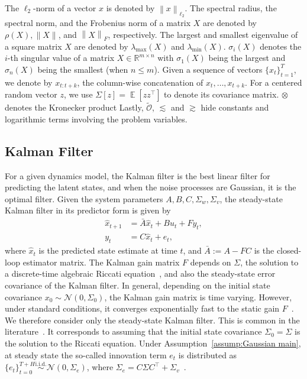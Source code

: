 \documentclass[11pt]{article}
\renewcommand{\cite}{\citep}
\newcommand{\xtil}{\hat{x}}
\newcommand{\Ncal}{\mathcal{N}}
\newcommand{\Ocal}{\mathcal{O}}
\newcommand{\E}{\operatorname{\mathbb{E}}}
\newcommand{\norm}[1]{\|{#1} \|}
\newcommand{\R}{\mathbb{R}}				%
\newcommand{\distas}{\overset{\text{i.i.d.}}{\sim}}
\newcommand{\T}{\top}
\newcommand{\fronorm}[1]{\left\|#1\right\|_{F}}
\newcommand{\twonorm}[1]{\left\|#1\right\|_{\ell_2}}
\newcommand{\<}{\langle}
\renewcommand{\>}{\rangle}
\numberwithin{equation}{section}
\begin{document}
 The $\ell_2$-norm of a vector $x$ is denoted by $\twonorm{x}$.
The spectral radius, the spectral norm, and the Frobenius norm of a matrix $X$ are denoted by $\rho(X), \norm{X}$, and $\fronorm{X}$, respectively. 
The largest and smallest eigenvalue of a square matrix $X$ are denoted by $\lambda_{\max}(X)$ and $\lambda_{\min}(X)$. $\sigma_i(X)$ denotes the $i$-th singular value of a matrix $X \in \R^{m \times n}$ with $\sigma_1(X)$ being the largest and $\sigma_{n}(X)$ being the smallest (when $n \leq m$). 
Given a sequence of vectors $\{x_t\}_{t=1}^T$, we denote by $x_{t:t+k}$, the column-wise concatenation of $x_t, \dots, x_{t+k}$. For a centered random vector $z$, we use $\Sigma[z] = \E[z z^\T]$ to denote its covariance matrix. $\otimes$ denotes the Kronecker product Lastly, $\tilde{\Ocal}$, $\lesssim$ and $\gtrsim$ hide constants and logarithmic terms involving the problem variables. 

\subsection{Kalman Filter}
For a given dynamics model, the Kalman filter is the best linear filter for predicting the latent states,
and when the noise processes are Gaussian, it is the optimal filter. 
Given the system parameters $A,B,C, \Sigma_w, \Sigma_v$, the steady-state Kalman filter in its predictor form is given by
\begin{equation}
\begin{aligned} \label{eqn:KF_Predictor form}
	\xtil_{t+1} &= 
    \bar A\xtil_t + B u_t + F y_t,\\
	y_t &= C \xtil_t +  e_t,
\end{aligned}
\end{equation}
where $\xtil_t$ is the predicted state estimate at time $t$, and $\bar A := A - F C$ is the closed-loop estimator matrix. The Kalman gain matrix $F$ depends on $\Sigma$, the solution to a discrete-time algebraic Riccati equation~\citep{tian2023toward}, and also the steady-state error covariance of the Kalman filter. 
In general, depending on the initial state covariance $x_0 \sim \Ncal(0, \Sigma_0)$, the Kalman gain matrix is time varying. However, under standard conditions, it converges exponentially fast to the static gain $F$~\citep{komaroff2002iterative}. 
We therefore consider only the steady-state Kalman filter.
This is common in the literature~\cite{tsiamis2019finite,lale2020logarithmic}. 
It corresponds to assuming that the initial state covariance $\Sigma_0=\Sigma$ is the solution to the Riccati equation.
Under Assumption~\ref{assump:Gaussian main}, at steady state the so-called innovation term $e_t$ is distributed as $\{e_t\}_{t=0}^{T+H} \distas \Ncal(0, \Sigma_e)$, where $\Sigma_e = C \Sigma C^\T + \Sigma_v$~\citep{anderson2005optimal}. 
\end{document}
